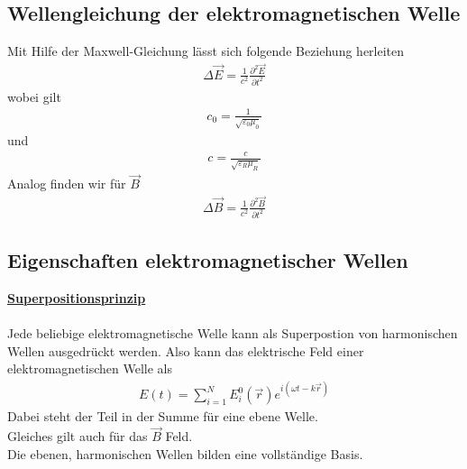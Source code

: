 \documentclass[a4paper,12pt]{report}
\begin{document}
\subsection{Wellengleichung der elektromagnetischen Welle}

Mit Hilfe der Maxwell-Gleichung lässt sich folgende Beziehung herleiten 
\begin{align}
\Delta \vec{E} = \frac{1}{c^2} \frac{\partial^2 \vec{E}}{\partial t^2} 
\end{align}
wobei gilt 
\begin{align}
c_0 = \frac{1}{\sqrt{\varepsilon_0\mu_0}}
\end{align}
und 
\begin{align}
c = \frac{c}{\sqrt{\varepsilon_R\mu_R}}
\end{align}
Analog finden wir für $\vec{B}$
\begin{align}
\Delta \vec{B} = \frac{1}{c^2} \frac{\partial^2 \vec{B}}{\partial t^2} 
\end{align}

\subsection{Eigenschaften elektromagnetischer Wellen}
\underline{\textbf{Superpositionsprinzip}} \\\\
Jede beliebige elektromagnetische Welle kann als Superpostion von harmonischen Wellen ausgedrückt werden. Also kann das elektrische Feld einer elektromagnetischen Welle als 
\begin{align}
E(t) = \sum_{i=1}^N  E_i^0(\vec{r}) e^{i(\omega t - k\vec{r})}
\end{align}
Dabei steht der Teil in der Summe für eine ebene Welle. \\
Gleiches gilt auch für das $\vec{B}$ Feld. \\
Die ebenen, harmonischen Wellen bilden eine vollständige Basis. \\
\end{document}
